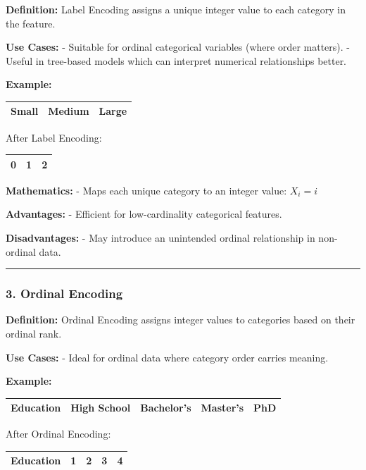 \documentclass[12pt]{book}
\begin{document}
\textbf{Definition:} Label Encoding assigns a unique integer value to
each category in the feature.

\textbf{Use Cases:} - Suitable for ordinal categorical variables (where
order matters). - Useful in tree-based models which can interpret
numerical relationships better.

\textbf{Example:} 

\begin{tabular}{|c|c|c|}
  \hline
  \textbf{Small} & \textbf{Medium} & \textbf{Large} \\ \hline
\end{tabular}

After Label Encoding: 

\begin{tabular}{|c|c|c|}
  \hline
  \textbf{0} & \textbf{1} & \textbf{2} \\ \hline
\end{tabular}


\textbf{Mathematics:} - Maps each unique category to an integer value: \(X_{i} = i \)

\textbf{Advantages:} - Efficient for low-cardinality categorical
features.

\textbf{Disadvantages:} - May introduce an unintended ordinal
relationship in non-ordinal data.

\begin{center}\rule{0.5\linewidth}{0.5pt}\end{center}

\subsubsection{\texorpdfstring{3. \textbf{Ordinal
Encoding}}{3. Ordinal Encoding}}\label{ordinal-encoding}

\textbf{Definition:} Ordinal Encoding assigns integer values to
categories based on their ordinal rank.

\textbf{Use Cases:} - Ideal for ordinal data where category order
carries meaning.

\textbf{Example:} 

\begin{tabular}{|c|c|c|c|c|}
  \hline
  \textbf{Education} & \textbf{High School}  & \textbf{Bachelor’s} & \textbf{Master’s} & \textbf{PhD} \\ \hline
\end{tabular}


After Ordinal Encoding: 

\begin{tabular}{|c|c|c|c|c|}
  \hline
  \textbf{Education} & \textbf{1}  & \textbf{2} & \textbf{3} & \textbf{4} \\ \hline
\end{tabular}
\end{document}
